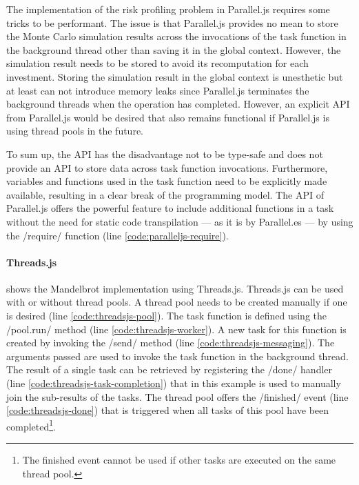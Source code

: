 The implementation of the risk profiling problem in Parallel.js requires some tricks to be performant. The issue is that Parallel.js provides no mean to store the Monte Carlo simulation results across the invocations of the task function in the background thread other than saving it in the global context. However, the simulation result needs to be stored to avoid its recomputation for each investment. Storing the simulation result in the global context is unesthetic but at least can not introduce memory leaks since Parallel.js terminates the background threads when the operation has completed. However, an explicit API from Parallel.js would be desired that also remains functional if Parallel.js is using thread pools in the future.

To sum up, the API has the disadvantage not to be type-safe and does not provide an API to store data across task function invocations. Furthermore, variables and functions used in the task function need to be explicitly made available, resulting in a clear break of the programming model. The API of Parallel.js offers the powerful feature to include additional functions in a task without the need for static code transpilation --- as it is by Parallel.es --- by using the \javascriptinline/require/ function (line \ref{code:paralleljs-require}).

\paragraph{Threads.js}
 shows the Mandelbrot implementation using Threads.js. Threads.js can be used with or without thread pools. A thread pool needs to be created manually if one is desired (line \ref{code:threadsjs-pool}). The task function is defined using the \javascriptinline/pool.run/ method (line \ref{code:threadsjs-worker}). A new task for this function is created by invoking the \javascriptinline/send/ method (line \ref{code:threadsjs-messaging}). The arguments passed are used to invoke the task function in the background thread. The result of a single task can be retrieved by registering the \javascriptinline/done/ handler (line \ref{code:threadsjs-task-completion}) that in this example is used to manually join the sub-results of the tasks. The thread pool offers the \javascriptinline/finished/ event (line \ref{code:threadsjs-done}) that is triggered when all tasks of this pool have been completed\footnote{The finished event cannot be used if other tasks are executed on the same thread pool.}.

